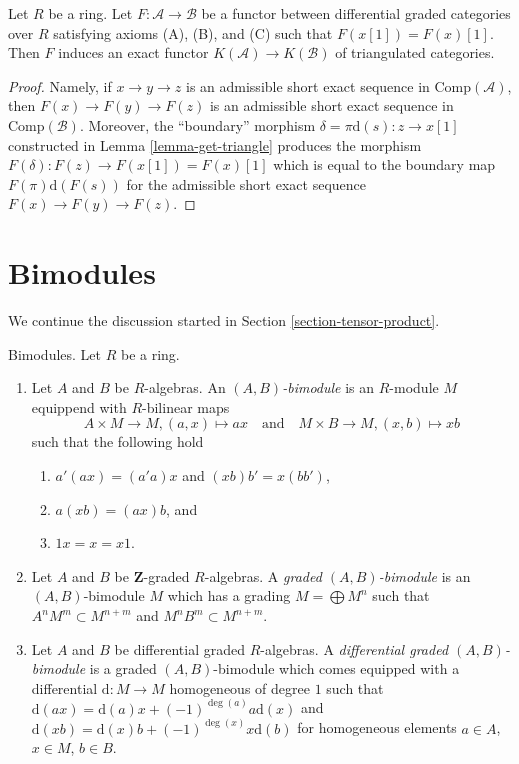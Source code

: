 \begin{lemma}
\label{lemma-functor-between-ABC}
Let $R$ be a ring. Let $F : \mathcal{A} \to \mathcal{B}$ be a functor
between differential graded categories over $R$ satisfying axioms
(A), (B), and (C) such that $F(x[1]) = F(x)[1]$.
Then $F$ induces an exact functor
$K(\mathcal{A}) \to K(\mathcal{B})$ of triangulated categories.
\end{lemma}

\begin{proof}
Namely, if $x \to y \to z$ is an admissible short exact sequence
in $\text{Comp}(\mathcal{A})$, then $F(x) \to F(y) \to F(z)$
is an admissible short exact sequence in $\text{Comp}(\mathcal{B})$.
Moreover, the ``boundary'' morphism $\delta = \pi\text{d}(s) : z \to x[1]$
constructed in Lemma \ref{lemma-get-triangle} produces the morphism
$F(\delta) : F(z) \to F(x[1]) = F(x)[1]$ which is equal to the boundary
map $F(\pi) \text{d}(F(s))$ for the admissible short exact sequence
$F(x) \to F(y) \to F(z)$.
\end{proof}





\section{Bimodules}
\label{section-bimodules}

\noindent
We continue the discussion started in Section \ref{section-tensor-product}.

\begin{definition}
\label{definition-bimodule}
Bimodules. Let $R$ be a ring.
\begin{enumerate}
\item Let $A$ and $B$ be $R$-algebras. An {\it $(A, B)$-bimodule}
is an $R$-module $M$ equippend with $R$-bilinear maps
$$
A \times M \to M, (a, x) \mapsto ax
\quad\text{and}\quad
M \times B \to M, (x, b) \mapsto xb
$$
such that the following hold
\begin{enumerate}
\item $a'(ax) = (a'a)x$ and $(xb)b' = x(bb')$,
\item $a(xb) = (ax)b$, and
\item $1 x = x = x 1$.
\end{enumerate}
\item Let $A$ and $B$ be $\mathbf{Z}$-graded $R$-algebras. A
{\it graded $(A, B)$-bimodule} is an $(A, B)$-bimodule $M$ which
has a grading $M = \bigoplus M^n$ such that
$A^n M^m \subset M^{n + m}$ and $M^n B^m \subset M^{n + m}$.
\item Let $A$ and $B$ be differential graded $R$-algebras. A
{\it differential graded $(A, B)$-bimodule} is a graded $(A, B)$-bimodule
which comes equipped with a differential
$\text{d} : M \to M$ homogeneous of degree $1$
such that $\text{d}(ax) = \text{d}(a)x + (-1)^{\deg(a)}a\text{d}(x)$ and
$\text{d}(xb) = \text{d}(x)b + (-1)^{\deg(x)}x\text{d}(b)$
for homogeneous elements $a \in A$, $x \in M$, $b \in B$.
\end{enumerate}
\end{definition}

